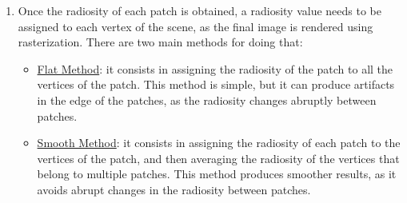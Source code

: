 \begin{enumerate}
    There are two main methods for solving this equation and obtaining the radiosity of each patch:
    \begin{itemize}
        \item \ul{Algebraic method}: it consists in rearranging the equation as:
        \begin{align*}
            B &= B^e + T \cdot B \\
            (I - T) \cdot B &= B^e \\
            B &= (I - T)^{-1} \cdot B^e
        \end{align*}
        where $I$ is the identity matrix. However, this method is computationally expensive, as it requires inverting the matrix $I - T$, which has a complexity of $O(N^3)$, where $N$ is the number of patches in the scene.
        \item \ul{Iterative method}: it consists in iteratively applying the equation until convergence. The equation can be solved iteratively as:
        \begin{align*}
            B^{(0)} &= B^e \\
            B^{(k+1)} &= B^e + T \cdot B^{(k)}
        \end{align*}
        where $B^{(k)}$ is the radiosity at iteration $k$, representing the light until $k$ bounces.
        
        This method is more efficient than the algebraic method, as it has a complexity of $O(N^2)$ per iteration, and it usually converges in a few iterations.
    \end{itemize}
    \item Once the radiosity of each patch is obtained, a radiosity value needs to be assigned to each vertex of the scene, as the final image is rendered using rasterization. There are two main methods for doing that:
    \begin{itemize}
        \item \ul{Flat Method}: it consists in assigning the radiosity of the patch to all the vertices of the patch. This method is simple, but it can produce artifacts in the edge of the patches, as the radiosity changes abruptly between patches.
        \item \ul{Smooth Method}: it consists in assigning the radiosity of each patch to the vertices of the patch, and then averaging the radiosity of the vertices that belong to multiple patches. This method produces smoother results, as it avoids abrupt changes in the radiosity between patches.
        

\end{itemize}
\end{enumerate}
